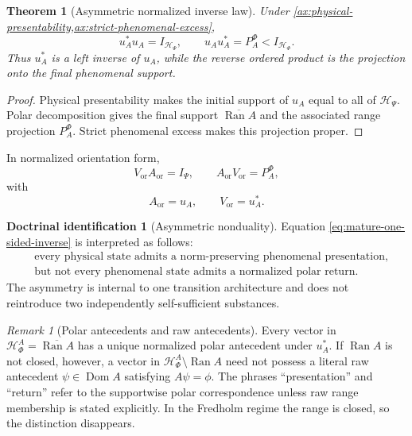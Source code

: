 \documentclass[11pt,reqno]{scrartcl}
\newcommand{\scrHP}{\mathscr H_{\Psi}}
\newcommand{\scrHF}{\mathscr H_{\Phi}}
\newcommand{\polA}{u_A}
\DeclareMathOperator{\Dom}{Dom}
\DeclareMathOperator{\Ran}{Ran}
\newcommand{\actHF}{\mathscr H_{\Phi}^{A}}
\newcommand{\suppProjF}{P_{A}^{\Phi}}
\theoremstyle{plain}
\newtheorem{theorem}{Theorem}[section]
\theoremstyle{definition}
\newtheorem{identification}[identification]{Doctrinal identification}
\theoremstyle{remark}
\newtheorem{remark}[remark]{Remark}
\begin{document}
\begin{theorem}[Asymmetric normalized inverse law]
\label{thm:asymmetric-inverse-law}
Under \cref{ax:physical-presentability,ax:strict-phenomenal-excess},
\begin{equation}
  \boxed{
  \polA^*\polA=I_{\scrHP},
  \qquad
  \polA\polA^*=\suppProjF<I_{\scrHF}.}
  \label{eq:mature-one-sided-inverse}
\end{equation}
Thus $u_A^*$ is a left inverse of $u_A$, while the reverse ordered product is
the projection onto the final phenomenal support.
\end{theorem}

\begin{proof}
Physical presentability makes the initial support of $u_A$ equal to all of
$\scrHP$.  Polar decomposition gives the final support
$\overline{\Ran A}$ and the associated range projection $\suppProjF$.  Strict
phenomenal excess makes this projection proper.
\end{proof}

In normalized orientation form,
\begin{equation}
  \boxed{
  V_{\mathrm{or}}A_{\mathrm{or}}=I_{\Psi},
  \qquad
  A_{\mathrm{or}}V_{\mathrm{or}}=\suppProjF,}
  \label{eq:orientation-AV-law}
\end{equation}
with
\begin{equation}
  A_{\mathrm{or}}=u_A,
  \qquad
  V_{\mathrm{or}}=u_A^*.
\end{equation}

\begin{identification}[Asymmetric nonduality]
\label{id:asymmetric-nonduality}
Equation \eqref{eq:mature-one-sided-inverse} is interpreted as follows:
\begin{equation}
  \boxed{
  \begin{aligned}
  &\text{every physical state admits a norm-preserving phenomenal presentation,}\\
  &\text{but not every phenomenal state admits a normalized polar return.}
  \end{aligned}}
  \label{eq:asymmetric-nonduality-reading}
\end{equation}
The asymmetry is internal to one transition architecture and does not
reintroduce two independently self-sufficient substances.
\end{identification}

\begin{remark}[Polar antecedents and raw antecedents]
\label{rem:polar-vs-raw-antecedent}
Every vector in $\actHF=\overline{\Ran A}$ has a unique normalized polar
antecedent under $u_A^*$.  If $\Ran A$ is not closed, however, a vector in
$\actHF\setminus\Ran A$ need not possess a literal raw antecedent
$\psi\in\Dom A$ satisfying $A\psi=\phi$.  The phrases ``presentation'' and
``return'' refer to the supportwise polar correspondence unless raw range
membership is stated explicitly.  In the Fredholm regime the range is closed,
so the distinction disappears.
\end{remark}
\end{document}
